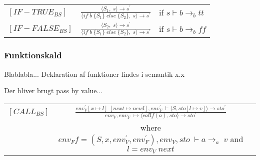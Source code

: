 \begin{semantik}
    \bgroup
    \def\arraystretch{3}
    \begin{table}[H]
    \centering
    \begin{tabular}{l c l}
        
        $[IF-TRUE_{BS}]$ & $
        \frac{\langle S_1,\;s\rangle  \rightarrow s^\prime}
        {\langle if\;b\;\{S_1\}\;else\;\{S_2\},\;s\rangle  \rightarrow s^\prime}
        $ & if $s \vdash b \rightarrow_b tt$ \\
        
        $[IF-FALSE_{BS}]$ & $
        \frac{\langle S_2,\;s\rangle  \rightarrow s^\prime}
        {\langle if\;b\;\{S_1\}\;else\;\{S_2\},\;s\rangle  \rightarrow s^\prime}
        $ & if $s \vdash b \rightarrow_b ff$ \\
        
    \end{tabular}
    \label{tab:ifelse}
    \end{table}
    \egroup
    \caption{If-else statement}
\end{semantik}
    
\noindent \subsubsection{Funktionskald}

Blablabla... Deklaration af funktioner findes i semantik x.x 

Der bliver brugt pass by value...


\begin{semantik}
    \bgroup
    \def\arraystretch{1.5}
    \begin{table}[H]
    \centering
    \begin{tabular}{l c l}
        
        $[CALL_{BS}]$ & 
        $ \frac
        {
            env_V^\prime [x \mapsto l]\;[next \mapsto new l], env_F^\prime\;\vdash \langle S, sto[l \mapsto v] \rangle \rightarrow sto^\prime
        }
        {
            env_V, env_F\;\mapsto \langle call f(a), sto \rangle \rightarrow sto^\prime
        } $ & \\
        
        & where $ env_F f = (S, x, env_V^\prime, env_F^\prime), env_V, sto\;\vdash a \rightarrow_a\;v$ and $l = env_V\;next $&
        
    \end{tabular}
    \label{tab:funktionskald}
    \end{table}
    \egroup
    \caption{Funktionskald}
\end{semantik}

